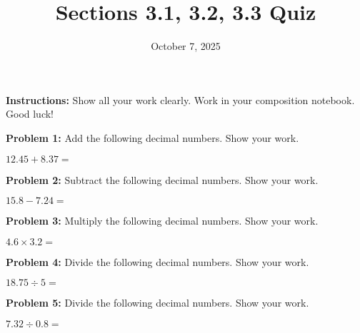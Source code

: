 \documentclass[12pt]{article}
\title{Sections 3.1, 3.2, 3.3 Quiz}
\date{October 7, 2025}
\begin{document}
\maketitle

\textbf{Instructions:} Show all your work clearly.  Work in your composition notebook.  Good luck!

\vspace{0.5in}

\textbf{Problem 1:} Add the following decimal numbers. Show your work.

\begin{center}
$12.45 + 8.37 = $ \underline{\hspace{2in}}
\end{center}

\vspace{0.2in}

\textbf{Problem 2:} Subtract the following decimal numbers. Show your work.

\begin{center}
$15.8 - 7.24 = $ \underline{\hspace{2in}}
\end{center}

\vspace{0.2in}

\textbf{Problem 3:} Multiply the following decimal numbers. Show your work.

\begin{center}
$4.6 \times 3.2 = $ \underline{\hspace{2in}}
\end{center}

\vspace{0.25in}

\textbf{Problem 4:} Divide the following decimal numbers. Show your work.

\begin{center}
$18.75 \div 5 = $ \underline{\hspace{2in}}
\end{center}

\vspace{0.2in}

\textbf{Problem 5:} Divide the following decimal numbers. Show your work.

\begin{center}
$7.32 \div 0.8 = $ \underline{\hspace{2in}}
\end{center}

\vspace{0.2in}
\end{document}
